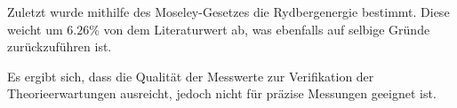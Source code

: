 Zuletzt wurde mithilfe des Moseley-Gesetzes die Rydbergenergie bestimmt. Diese weicht um 
$6.26\%$ von dem Literaturwert ab, was ebenfalls auf selbige Gründe zurückzuführen ist. 

Es ergibt sich, dass die Qualität der Messwerte zur Verifikation der Theorieerwartungen ausreicht, jedoch nicht für präzise Messungen geeignet ist.
